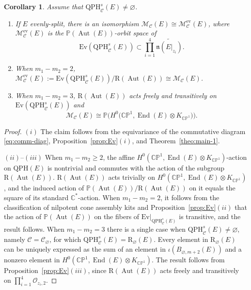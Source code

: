 \documentclass[10pt,a4paper]{amsart}
\newcommand{\field}[1]{\ensuremath{\mathbb{#1}}}
\newcommand{\CC}{\field{C}}
\newcommand{\PP}{\field{P}}
\newcommand{\curly}[1]{\mathscr{#1}}
\newcommand{\cM}{\curly{M}}
\newcommand{\cO}{\curly{O}}
\newcommand{\qC}{\mathcal{C}}
\DeclareMathOperator{\Aut}{Aut}
\DeclareMathOperator{\End}{End}
\numberwithin{equation}{section}
\newtheorem{Corollary}[Theorem]{Corollary}
\begin{document}
\begin{Corollary}%
Assume that $\mathrm{QPH}^{s}_{\qC}(E)\neq\varnothing $.
\begin{enumerate}\itemsep=0pt
\item[$(i)$] If $E$ evenly-split, there is an isomorphism $\cM_{\qC}(E)\cong \cM^{\mathrm{ev}}_{\qC}(E)$, where $\cM^{\mathrm{ev}}_{\qC}(E)$ is the $\PP(\Aut(E))$-orbit space of
\[
\mathrm{Ev}(\mathrm{QPH}^{s}_{\qC}(E))\subset \prod_{i=1}^{4}\widetilde{\mathfrak{n}(E\vert_{z_{i}})}.
\]
\item[$(ii)$] When $m_{1}-m_{2}= 2$, $\cM^{\mathrm{ev}}_{\qC}(E):= \mathrm{Ev}(\mathrm{QPH}^{s}_{\qC}(E))/\mathrm{R}(\Aut(E))\cong \cM_{\qC}(E)$.
\item[$(iii)$] When $m_{1}-m_{2}= 3$, $\mathrm{R}(\Aut(E))$ acts freely and transitively on $\mathrm{Ev}(\mathrm{QPH}^{s}_{\qC}(E))$ and
\[
\cM_{\qC}(E)\cong \PP\bigl(H^{0}\bigl(\CC\PP^{1},\End(E)\otimes K_{\CC\PP^{1}}\bigr)\bigr).
\]
\end{enumerate}
\end{Corollary}

\begin{proof}
$(i)$ The claim follows from the equivariance of the commutative diagram \eqref{eq:comm-diag}, Proposition~\ref{prop:Ev}$(i)$, and Theorem~\ref{theo:main-1}.

$(ii)$--$(iii)$ When $m_{1} - m_{2} \geq 2$, the affine $H^{0}(\CC\PP^{1},\End(E)\otimes K_{\CC\PP^{1}})$-action on $\mathrm{QPH}(E)$ is nontrivial and commutes with the action of the subgroup $\mathrm{R}(\Aut(E))$. $\mathrm{R}(\Aut(E))$ acts trivially on $H^{0}(\CC\PP^{1},\End(E)\otimes K_{\CC\PP^{1}})$, and the induced action of $\PP(\Aut(E))/\mathrm{R}(\Aut(E))$ on it equals the square of its standard $\CC^{*}$-action. When $m_{1}-m_{2}=2$, it follows from the classification of nilpotent cone assembly kits and Proposition~\ref{prop:Ev}$(ii)$ that the action of $\PP(\Aut(E))$ on the fibers of $\mathrm{Ev}\vert_{\mathrm{QPH}^{s}_{\qC}(E)}$ is transitive, and the result follows. When $m_{1}-m_{2}=3$ there is a single case when $\mathrm{QPH}^{s}_{\qC}(E)\neq\varnothing $, namely $\qC =\qC_{\varnothing }$, for which $\mathrm{QPH}^{s}_{\qC}(E) = \mathrm{R}_{\varnothing }(E)$. Every element in $\mathrm{R}_{\varnothing }(E)$ can be uniquely expressed as the sum of an element in $\iota(B_{\varnothing ,m+2}(E))$ and a nonzero element in $H^{0}(\CC\PP^{1},\End(E)\otimes K_{\CC\PP^{1}})$. The result follows from Proposition~\ref{prop:Ev}$(iii)$, since $\mathrm{R}(\Aut(E))$ acts freely and transitively on $\prod_{i=1}^{4}\cO_{z_{i},2}$.
\end{proof}
\end{document}
